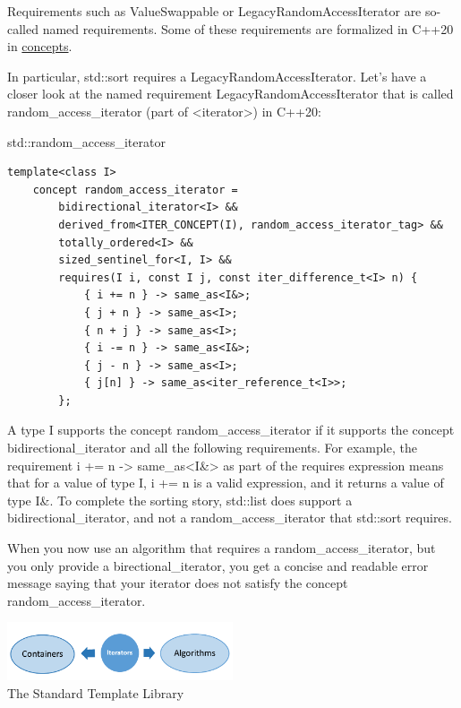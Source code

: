 Requirements such as ValueSwappable or LegacyRandomAccessIterator are so-called named requirements. Some of these requirements are formalized in C++20 in \href{https://en.cppreference.com/w/cpp/language/constraints}{concepts}.

In particular, std::sort requires a LegacyRandomAccessIterator. Let’s have a closer look at the named requirement LegacyRandomAccessIterator that is called random\_access\_iterator (part of <iterator>) in C++20:

\noindent
std::random\_access\_iterator
\begin{lstlisting}[style=styleCXX]
template<class I>
	concept random_access_iterator =
		bidirectional_iterator<I> &&
		derived_from<ITER_CONCEPT(I), random_access_iterator_tag> &&
		totally_ordered<I> &&
		sized_sentinel_for<I, I> &&
		requires(I i, const I j, const iter_difference_t<I> n) {
			{ i += n } -> same_as<I&>;
			{ j + n } -> same_as<I>;
			{ n + j } -> same_as<I>;
			{ i -= n } -> same_as<I&>;
			{ j - n } -> same_as<I>;
			{ j[n] } -> same_as<iter_reference_t<I>>;
		};
\end{lstlisting}

A type I supports the concept random\_access\_iterator if it supports the concept bidirectional\_iterator and all the following requirements. For example, the requirement { i += n } -> same\_as<I\&> as part of the requires expression means that for a value of type I, { i += n } is a valid expression, and it returns a value of type I\&. To complete the sorting story, std::list does support a bidirectional\_iterator, and not a random\_access\_iterator that std::sort requires.

When you now use an algorithm that requires a random\_access\_iterator, but you only provide a birectional\_iterator, you get a concise and readable error message saying that your iterator does not satisfy the concept random\_access\_iterator.

\begin{center}
\includegraphics[width=0.5\textwidth]{content/3/chapter4/images/6.png}\\
The Standard Template Library
\end{center}

